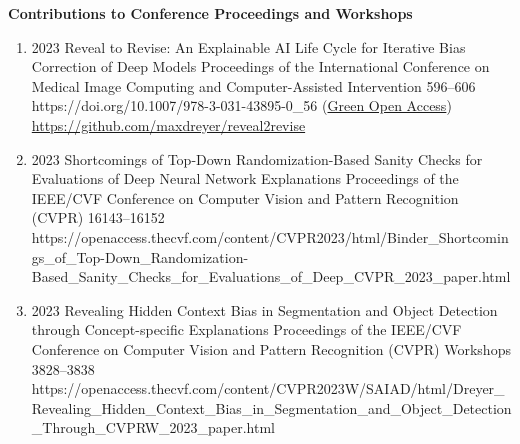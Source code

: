 \headedsection %
{\bf Contributions to Conference Proceedings and Workshops}{}
{
    \begin{enumerate}
        
        \item {}
                            {2023}
                            {Reveal to Revise: An Explainable AI Life Cycle for Iterative Bias Correction of Deep Models}
                            {Proceedings of the International Conference on Medical Image Computing and Computer-Assisted Intervention}
                            {596--606}
                            {https://doi.org/10.1007/978-3-031-43895-0_56}
                            {(\href{https://arxiv.org/abs/2303.12641}{Green Open Access})\\ \href{https://github.com/maxdreyer/reveal2revise}{https://github.com/maxdreyer/reveal2revise}}


        \item {}
                            {2023}
                            {Shortcomings of Top-Down Randomization-Based Sanity Checks for Evaluations of Deep Neural Network Explanations}
                            {Proceedings of the IEEE/CVF Conference on Computer Vision and Pattern Recognition (CVPR)}
                            {16143--16152}
                            {https://openaccess.thecvf.com/content/CVPR2023/html/Binder_Shortcomings_of_Top-Down_Randomization-Based_Sanity_Checks_for_Evaluations_of_Deep_CVPR_2023_paper.html}

        \item {}
                            {2023}
                            {Revealing Hidden Context Bias in Segmentation and Object Detection through Concept-specific Explanations}
                            {Proceedings of the IEEE/CVF Conference on Computer Vision and Pattern Recognition (CVPR) Workshops}
                            {3828--3838}
                            {https://openaccess.thecvf.com/content/CVPR2023W/SAIAD/html/Dreyer_Revealing_Hidden_Context_Bias_in_Segmentation_and_Object_Detection_Through_CVPRW_2023_paper.html}


\end{enumerate}}
